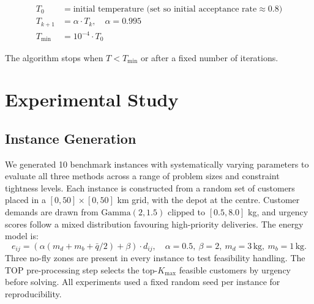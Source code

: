 \documentclass[12pt,a4paper]{article}
\begin{document}
\begin{align*}
  T_0 &= \text{initial temperature (set so initial acceptance rate} \approx 0.8) \\
  T_{k+1} &= \alpha \cdot T_k, \quad \alpha = 0.995 \\
  T_{\min} &= 10^{-4} \cdot T_0
\end{align*}

The algorithm stops when $T < T_{\min}$ or after a fixed number of iterations.

\section{Experimental Study}

\subsection{Instance Generation}

We generated 10 benchmark instances with systematically varying parameters to evaluate
all three methods across a range of problem sizes and constraint tightness levels. Each
instance is constructed from a random set of customers placed in a $[0,50]\times[0,50]$
km grid, with the depot at the centre. Customer demands are drawn from
$\text{Gamma}(2, 1.5)$ clipped to $[0.5, 8.0]$ kg, and urgency scores follow a mixed
distribution favouring high-priority deliveries. The energy model is:
\[
  e_{ij} = (\alpha(m_d + m_b + \bar{q}/2) + \beta)\cdot d_{ij},
  \quad \alpha=0.5,\ \beta=2,\ m_d=3\,\text{kg},\ m_b=1\,\text{kg}.
\]
Three no-fly zones are present in every instance to test feasibility handling.
The TOP pre-processing step selects the top-$K_{\max}$ feasible customers by urgency
before solving. All experiments used a fixed random seed per instance for reproducibility.
\end{document}

